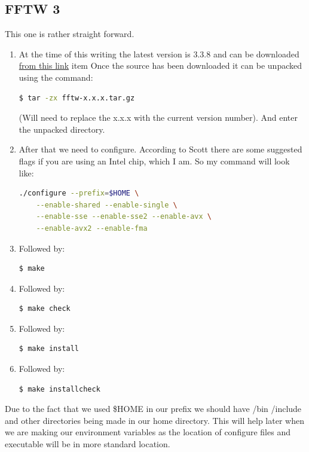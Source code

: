 \documentclass{article}
\begin{document}
\subsection{FFTW 3}
    This one is rather straight forward. 
\begin{enumerate}
    \item At the time of this writing the latest version is 3.3.8 and can be downloaded \href{http://www.fftw.org/download.html}{from this link}
    item \noindent Once the source has been downloaded it can be unpacked using the command:
	\begin{lstlisting}[language=bash]
	    $ tar -zx fftw-x.x.x.tar.gz 
	\end{lstlisting}
    (Will need to replace the x.x.x with the current version number). And enter the unpacked directory.
    \item \noindent After that we need to configure. According to Scott there are some suggested flags if you are
    	using an Intel chip, which I am. So my command will look like: 
	\begin{lstlisting}[language=bash]
	./configure --prefix=$HOME \
	--enable-shared --enable-single \
	--enable-sse --enable-sse2 --enable-avx \
	--enable-avx2 --enable-fma
	\end{lstlisting}
	\item \noindent Followed by: \begin{lstlisting}[language=bash]
	$ make
	\end{lstlisting}
	\item \noindent Followed by: 
	\begin{lstlisting}[language=bash]
	$ make check
	\end{lstlisting}
	\item \noindent Followed by: 
	\begin{lstlisting}[language=bash]
	$ make install
	\end{lstlisting}
	\item \noindent Followed by:
	\begin{lstlisting}[language=bash]
		 $ make installcheck
		\end{lstlisting}
    \end{enumerate}
    Due to the fact that we used \$HOME in our prefix we should have /bin /include and other directories
    being made in our home directory. This will help later when we are making our environment variables
    as the location of configure files and executable will be in more standard location.
    
\end{document}
